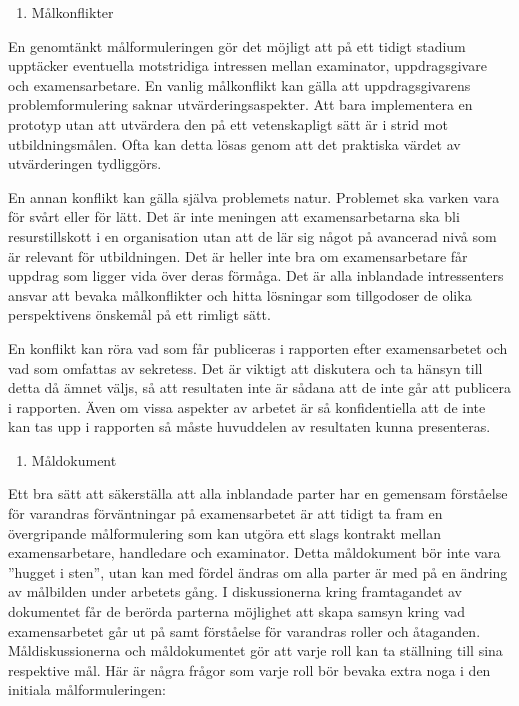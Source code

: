 \begin{enumerate}
\def\labelenumi{\arabic{enumi}.}
\item
  Målkonflikter
\end{enumerate}

En genomtänkt målformuleringen gör det möjligt att på ett tidigt stadium
upptäcker eventuella motstridiga intressen mellan examinator,
uppdragsgivare och examensarbetare. En vanlig målkonflikt kan gälla att
uppdragsgivarens problemformulering saknar utvärderingsaspekter. Att
bara implementera en prototyp utan att utvärdera den på ett
vetenskapligt sätt är i strid mot utbildningsmålen. Ofta kan detta lösas
genom att det praktiska värdet av utvärderingen tydliggörs.

En annan konflikt kan gälla själva problemets natur. Problemet ska
varken vara för svårt eller för lätt. Det är inte meningen att
examensarbetarna ska bli resurstillskott i en organisation utan att de
lär sig något på avancerad nivå som är relevant för utbildningen. Det är
heller inte bra om examensarbetare får uppdrag som ligger vida över
deras förmåga. Det är alla inblandade intressenters ansvar att bevaka
målkonflikter och hitta lösningar som tillgodoser de olika perspektivens
önskemål på ett rimligt sätt.

En konflikt kan röra vad som får publiceras i rapporten efter
examensarbetet och vad som omfattas av sekretess. Det är viktigt att
diskutera och ta hänsyn till detta då ämnet väljs, så att resultaten
inte är sådana att de inte går att publicera i rapporten. Även om vissa
aspekter av arbetet är så konfidentiella att de inte kan tas upp i
rapporten så måste huvuddelen av resultaten kunna presenteras.

\begin{enumerate}
\def\labelenumi{\arabic{enumi}.}
\item
  Måldokument
\end{enumerate}

Ett bra sätt att säkerställa att alla inblandade parter har en gemensam
förståelse för varandras förväntningar på examensarbetet är att tidigt
ta fram en övergripande målformulering som kan utgöra ett slags kontrakt
mellan examensarbetare, handledare och examinator. Detta måldokument bör
inte vara ''hugget i sten'', utan kan med fördel ändras om alla parter
är med på en ändring av målbilden under arbetets gång. I diskussionerna
kring framtagandet av dokumentet får de berörda parterna möjlighet att
skapa samsyn kring vad examensarbetet går ut på samt förståelse för
varandras roller och åtaganden. Måldiskussionerna och måldokumentet gör
att varje roll kan ta ställning till sina respektive mål. Här är några
frågor som varje roll bör bevaka extra noga i den initiala
målformuleringen:

